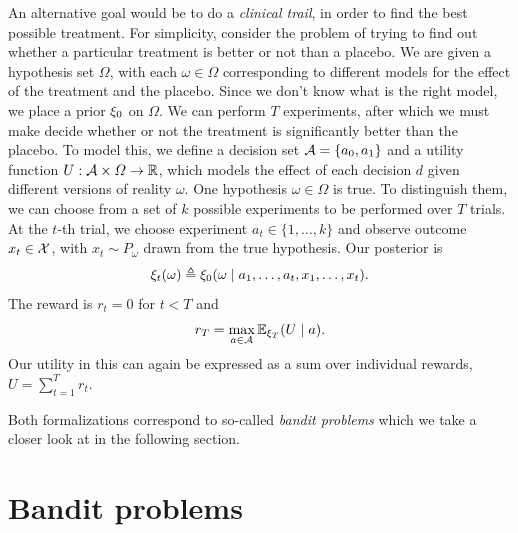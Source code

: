 \begin{example}
  An alternative goal would be to do a \emph{clinical trail}, in order to find the best possible treatment. For simplicity, consider the problem of trying to find out whether a particular treatment is better or not than a placebo.  We are given a hypothesis set $\Omega$, with each $\omega \in \Omega$ corresponding to different models for the effect of the treatment and the placebo. Since we don't know what is the right model, we place a prior $\xi_0$ on $\Omega$. We can perform $T$ experiments, after which we must make decide whether or not the treatment is significantly better than the placebo. To model this, we define a decision set ${\mathcal{A}} = \{a_0, a_1\}$ and a utility function $U : {\mathcal{A}} \times \Omega \to {\mathbb{R}}$, which models the effect of each decision $d$ given different versions of reality $\omega$. One hypothesis $\omega \in \Omega$ is true. To distinguish them, we can choose
  from a set of $k$ possible experiments to be performed over $T$
  trials.  At the $t$-th trial, we choose experiment $a_t \in \{1,
  \ldots, k\}$ and observe outcome $x_t \in {\mathcal{X}}$, with $x_t \sim
  P_\omega$ drawn from the true hypothesis. Our posterior is
  \[
  \xi_t(\omega) \mathrel{\triangleq}
  \xi_0(\omega \mid a_1, \ldots, a_t, x_1, \ldots, x_t).
  \]
  The reward is $r_t = 0$ for $t < T$ and
  \[
  r_T = \max_{a \in {\mathcal{A}}}\mathop{\mbox{\ensuremath{\mathbb{E}}}}\nolimits_{\xi_T}(U \mid a).
  \]
  Our utility in this can again be expressed as a sum over individual rewards,  $U = \sum_{t=1}^T r_t$.
\end{example}
Both formalizations correspond to so-called {\em bandit problems} which we take a closer look at in the following section.

\section{Bandit problems}
\label{sec:exp-design-bandit}

